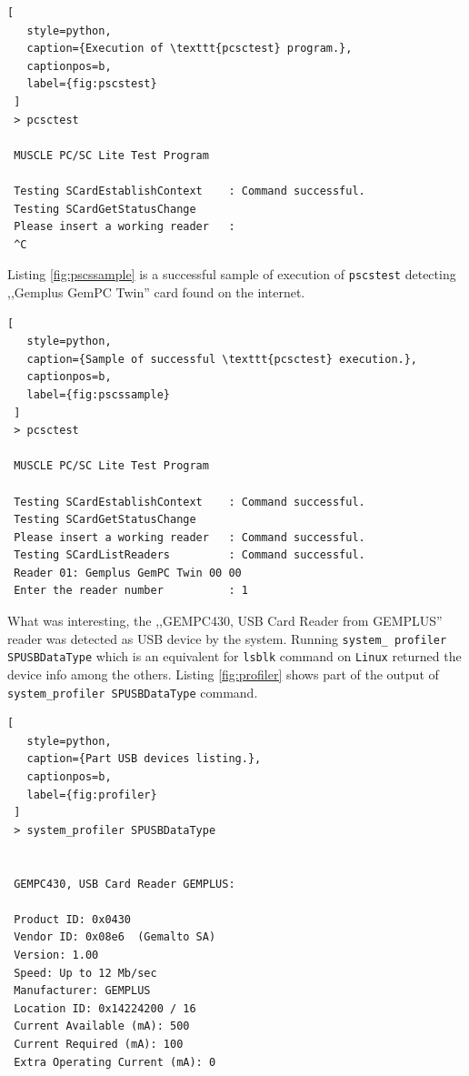 \begin{minipage}{\linewidth}
  \begin{lstlisting}[
   style=python,
   caption={Execution of \texttt{pcsctest} program.},
   captionpos=b,
   label={fig:pscstest}
 ]
 > pcsctest

 MUSCLE PC/SC Lite Test Program

 Testing SCardEstablishContext    : Command successful.
 Testing SCardGetStatusChange
 Please insert a working reader   :
 ^C
  \end{lstlisting}
\end{minipage}

Listing \ref{fig:pscssample} is a successful sample of execution of \texttt{pscstest} detecting ,,Gemplus GemPC Twin'' card found on the internet.

\begin{minipage}{\linewidth}
  \begin{lstlisting}[
   style=python,
   caption={Sample of successful \texttt{pcsctest} execution.},
   captionpos=b,
   label={fig:pscssample}
 ]
 > pcsctest

 MUSCLE PC/SC Lite Test Program

 Testing SCardEstablishContext    : Command successful.
 Testing SCardGetStatusChange
 Please insert a working reader   : Command successful.
 Testing SCardListReaders         : Command successful.
 Reader 01: Gemplus GemPC Twin 00 00
 Enter the reader number          : 1

  \end{lstlisting}
\end{minipage}

What was interesting, the ,,GEMPC430, USB Card Reader from GEMPLUS'' reader was detected as USB device by the system. Running \texttt{system\_ profiler SPUSBDataType} which is an equivalent for \texttt{lsblk} command on \texttt{Linux} returned the device info among the others. Listing \ref{fig:profiler} shows part of the output of \texttt{system\_profiler SPUSBDataType} command.

\begin{minipage}{\linewidth}
  \begin{lstlisting}[
   style=python,
   caption={Part USB devices listing.},
   captionpos=b,
   label={fig:profiler}
 ]
 > system_profiler SPUSBDataType


 GEMPC430, USB Card Reader GEMPLUS:

 Product ID: 0x0430
 Vendor ID: 0x08e6  (Gemalto SA)
 Version: 1.00
 Speed: Up to 12 Mb/sec
 Manufacturer: GEMPLUS
 Location ID: 0x14224200 / 16
 Current Available (mA): 500
 Current Required (mA): 100
 Extra Operating Current (mA): 0

  \end{lstlisting}
\end{minipage}

